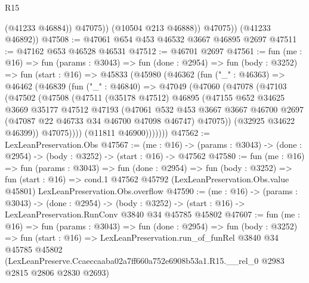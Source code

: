 \begin{lexlean}{R15}
\begin{coremodule}
                  (@41233 @46884))
                @47075))
            (@10504 @213 @46888))
          @47075))
      (@41233 @46892))
@47508 := @47061 @654 @453 @46532 @3667 @46895 @2697
@47511 := @47162 @653 @46528 @46531
@47512 := @46701 @2697
@47561 := fun (me : @16) =>
  fun (params : @3043) =>
  fun (done : @2954) =>
  fun (body : @3252) =>
  fun (start : @16) =>
  @45833
    (@45980
      (@46362
        (fun ("_" : @46363) =>
        @46462
          (@46839
            (fun ("_" : @46840) =>
            @47049
              (@47060
                (@47078
                  (@47103
                    (@47502
                      (@47508
                        (@47511
                          (@35178 @47512)
                          @46895
                          (@47155
                            @652
                            @34625
                            @3669
                            @35177
                            @47512
                            @47193
                            (@47061
                              @532
                              @453
                              @3667
                              @3667
                              @46700
                              @2697
                              (@47087 @22 @46733 @34 @46700 @47098 @46747)
                              @47075))
                          (@32925 @34622 @46399))
                        @47075))))
                (@11811 @46900)))))))
@47562 := LexLeanPreservation.Obs
@47567 := (me : @16) ->
  (params : @3043) -> (done : @2954) -> (body : @3252) -> (start : @16) -> @47562
@47580 := fun (me : @16) =>
  fun (params : @3043) =>
  fun (done : @2954) =>
  fun (body : @3252) =>
  fun (start : @16) =>
  cond.{1} @47562 @45792 (LexLeanPreservation.Obs.value @45801) LexLeanPreservation.Obs.overflow
@47590 := (me : @16) ->
  (params : @3043) ->
  (done : @2954) ->
  (body : @3252) -> (start : @16) -> LexLeanPreservation.RunConv @3840 @34 @45785 @45802
@47607 := fun (me : @16) =>
  fun (params : @3043) =>
  fun (done : @2954) =>
  fun (body : @3252) =>
  fun (start : @16) =>
  LexLeanPreservation.run_of_funRel
    @3840
    @34
    @45785
    @45802
    (LexLeanPreserve.Ccaeccaaba02a7ff660a752e6908b53a1.R15.__rel_0 @2983 @2815 @2806 @2830 @2693)
\end{coremodule}
\end{lexlean}
